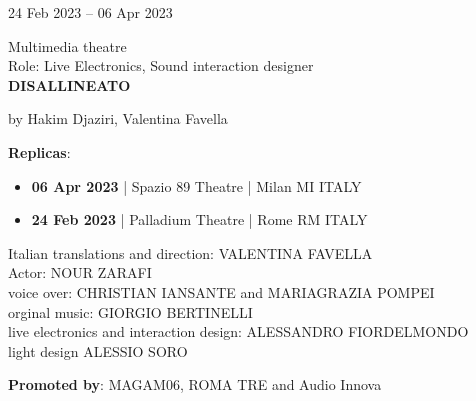 \documentclass[7pt,a4paper]{article}
\begin{document}
\begin{mdframed}[
    backgroundcolor=white,
    linecolor=white,
    linewidth=0pt,
    innerleftmargin=6pt,
    innerrightmargin=6pt,
    innertopmargin=6pt,
    innerbottommargin=6pt,
    skipabove=0pt,
    skipbelow=0pt
]

\begin{minipage}[t]{0.28\textwidth}

24 Feb 2023 – 06 Apr 2023


\end{minipage}
\begin{minipage}[t]{0.68\textwidth}
\small Multimedia theatre
\\\scriptsize Role: Live Electronics, Sound interaction designer
\\ \normalsize \textbf{DISALLINEATO}
\par\scriptsize by Hakim Djaziri, Valentina Favella

\vspace{0.25cm}



    \scriptsize \textbf{Replicas}:
    \begin{itemize}
    \par
        \item  \textbf{06 Apr 2023}    | Spazio 89 Theatre  | Milan MI ITALY
    \par
        \item  \textbf{24 Feb 2023}    | Palladium Theatre  | Rome RM ITALY
    
    \end{itemize}

\vspace{0.1cm}
\scriptsize

Italian translations and direction: VALENTINA FAVELLA\\Actor: NOUR ZARAFI\\voice over: CHRISTIAN IANSANTE and MARIAGRAZIA POMPEI\\orginal music: GIORGIO BERTINELLI\\live electronics and interaction design: ALESSANDRO FIORDELMONDO\\light design ALESSIO SORO

\vspace{0.1cm}
\par \textbf{Promoted by}: MAGAM06, ROMA TRE and Audio Innova
\end{minipage}
\vspace{0.25cm}
\end{mdframed}
\end{document}
